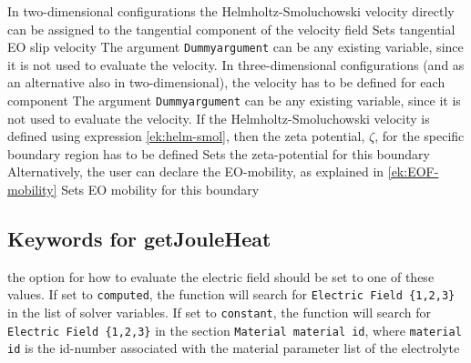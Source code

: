   \newline
  In two-dimensional configurations the Helmholtz-Smoluchowski velocity directly can be assigned to the tangential component of the velocity field
  \sifbegin
          Sets tangential EO slip velocity
  \sifend
  The argument \texttt{Dummyargument} can be any existing variable, since it is not used to evaluate the velocity.\newline
  In three-dimensional configurations (and as an alternative also in two-dimensional), the velocity has to be defined for each component
  \sifbegin
  \sifend
  The argument \texttt{Dummyargument} can be any existing variable, since it is not used to evaluate the velocity.\newline
  If the Helmholtz-Smoluchowski velocity is defined using expression \eqref{ek:helm-smol}, then the zeta potential, $\zeta$, for the specific boundary region has to be defined
  \sifbegin
    Sets the zeta-potential for this boundary
  \sifend
  Alternatively, the user can declare the EO-mobility, as explained in \eqref{ek:EOF-mobility}
    \sifbegin
        Sets EO mobility for this boundary
  \sifend
\sifend
\subsection{Keywords for getJouleHeat}
\sifbegin
  \sifbegin
    the option for how to evaluate the electric field should be set to one of these values.\newline
    If set to  \texttt{computed}, the function will search for \texttt{Electric Field \{1,2,3\}} in the list of solver variables. If set to \texttt{constant}, the function will search for \texttt{Electric Field \{1,2,3\}} in the section \texttt{Material material id}, where \texttt{material id} is the id-number associated with the material parameter list of the electrolyte
  \sifend

